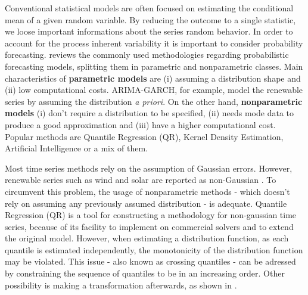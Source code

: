 
Conventional statistical models are often focused on estimating the conditional mean of a given random variable. %
By reducing the outcome to a single statistic, we loose important informations about the series random behavior. In order to account for the process inherent variability it is important to consider probability forecasting.
\cite{zhang_review_2014} reviews the commonly used methodologies regarding probabilistic forecasting models, splitting them in parametric and nonparametric classes. Main characteristics of \textbf{parametric models} are (i) assuming a distribution shape and (ii) low computational costs. ARIMA-GARCH, for example, model the renewable series by assuming the distribution \textit{a priori}. On the other hand, \textbf{nonparametric models} (i) don't require a distribution to be specified, (ii) needs mode data to produce a good approximation and (iii) have a higher computational cost. Popular methods are Quantile Regression (QR), Kernel Density Estimation,  Artificial Intelligence or a mix of them.


Most time series methods rely on the assumption of Gaussian errors. However, renewable series such as wind and solar are reported as non-Gaussian \cite{bessa2012time,jeon2012using,taylor2015forecasting,Wan2017}. To circumvent this problem, the usage of nonparametric methods - which doesn't rely on assuming any previously assumed distribution - is adequate. 
Quantile Regression (QR) is a tool for constructing a methodology for non-gaussian time series, because of its facility to implement on commercial solvers and to extend the original model.
However, when estimating a distribution function, as each quantile is estimated independently, the monotonicity of the distribution function may be violated.
This issue - also known as crossing quantiles - can be adressed by constraining the sequence of quantiles to be in an increasing order. Other possibility is making a transformation afterwards, as shown in \cite{chernozhukov_quantile_2010}.

